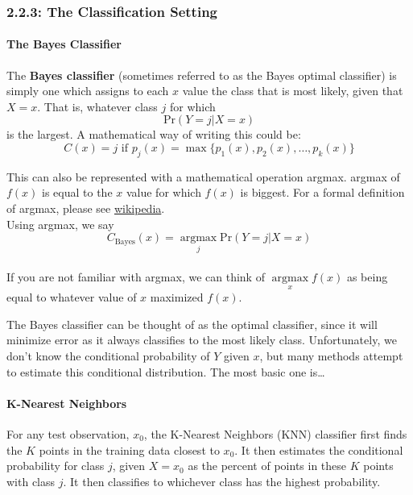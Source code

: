 \subsubsection*{2.2.3: The Classification Setting}\label{the-classification-setting}

\paragraph{The Bayes Classifier}


The \textbf{Bayes classifier} (sometimes referred to as the Bayes optimal classifier) is simply one which assigns to each \(x\) value the class that is most likely, given that \(X=x\). That is, whatever class \(j\) for which 
\begin{equation*}
\text{Pr}(Y=j | X=x)
\end{equation*}
is the largest. A mathematical way of writing this
could be: 
\begin{equation*} 
C(x) = j \text{ if } p_j(x) = \max\{p_1(x), p_2(x), \ldots, p_k(x)\}
\end{equation*}

\begin{aside}
	This can also be represented with a mathematical operation	argmax.  argmax of \(f(x)\) is equal to the \(x\) value
	for which \(f(x)\) is biggest. For a formal definition of argmax,
	please see \href{https://en.wikipedia.org/wiki/Arg_max}{wikipedia}.\\
	Using argmax, we say
	\begin{equation*}
		C_{\text{Bayes}} (x) = \underset{j}{\operatorname{argmax}} \text{Pr}(Y=j | X=x)
	\end{equation*}\\
	If you are not familiar with argmax, we can think of \(\underset{x}{\operatorname{argmax}} f(x)\) as being equal to whatever value
	of \(x\) maximized \(f(x)\).
\end{aside}

The Bayes classifier can be thought of as the optimal classifier, since it will minimize error as it always 
classifies to the most likely class. Unfortunately, we don't know the conditional probability of \(Y\) given
\(x\), but many methods attempt to estimate this conditional distribution. The most basic one is\ldots{}

\paragraph{K-Nearest Neighbors}
For any test observation, \(x_0\), the K-Nearest Neighbors (KNN)
classifier first finds the \(K\) points in the training data closest to
\(x_0\). It then estimates the conditional probability for class \(j\),
given \(X=x_0\) as the percent of points in these \(K\) points with
class \(j\). It then classifies to whichever class has the highest
probability.

